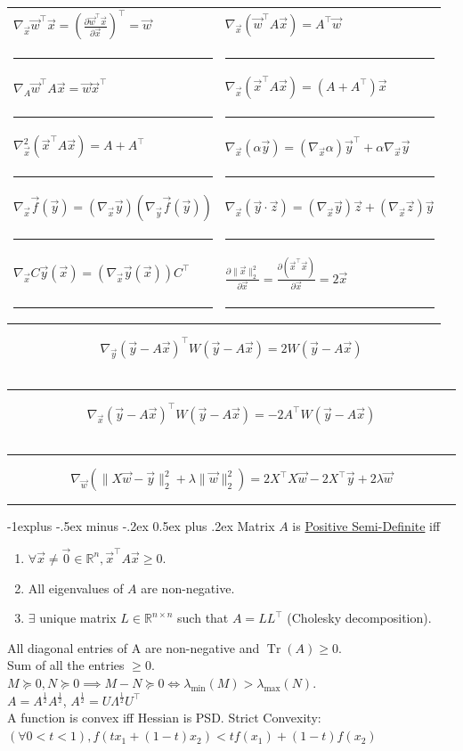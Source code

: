 \documentclass[10pt,landscape]{article}
\makeatletter
\DeclareMathOperator*{\trace}{Tr}
\newcommand{\pderiv}[2]{\frac{\partial #1}{\partial #2}}
\newcommand{\wrap}[3]{\left#1#3\right#2}
\renewcommand{\subsection}{\@startsection{subsection}{2}{0mm}%
                                {-1explus -.5ex minus -.2ex}%
                                {0.5ex plus .2ex}%
                                {\normalfont\normalsize\bfseries}}
\makeatother
\begin{document}
\begin{multicols}{3}
\begin{tabular}{@{}p{}%
                @{}p{}@{}}
$\nabla_{\vec x}{\vec w^\top \vec x} = \wrap(){\pderiv{\vec w^\top \vec x}{\vec x}}^\top = \vec{w}$ & $\nabla_{\vec x}{(\vec w^\top A\vec x)}= A^{\top}\vec w$ \\
\hrule&\hrule\\
$\nabla_{A}{\vec w^\top A\vec x}=\vec w\vec x^\top$ & $\nabla_{\vec x}{(\vec x^\top A\vec x)} = (A+A^\top)\vec x$ \\
\hrule&\hrule\\
$\nabla_{\vec x}^2{(\vec x^\top A\vec x)} = A+A^\top$ & $\nabla_{\vec x}{(\alpha \vec{y})} = (\nabla_{\vec x}{\alpha})\vec{y}^{\top} + \alpha \nabla_{\vec x}{\vec y}$ \\
\hrule&\hrule
\\
$\nabla_{\vec x}{\vec{f}(\vec y)} = (\nabla_{\vec x}{\vec y})(\nabla_{\vec y}{\vec{f}(\vec y)})$ & $\nabla_{\vec x}(\vec{y} \cdot \vec{z}) = (\nabla_{\vec x}{\vec y})\vec{z}+(\nabla_{\vec x}{\vec z})\vec{y}$ \\
\hrule & \hrule
\\
$\nabla_{\vec x}{C\vec y(\vec{x})} = (\nabla_{\vec x}{\vec y(\vec x)})C^\top$ & $\pderiv{\|\vec x\|_2^2}{\vec x}=\pderiv{(\vec x^\top\vec x)}{\vec x}=2\vec x$ \\
\hrule&\hrule
\end{tabular} \vspace{-0.1cm}
$$\nabla_{\vec{y}} (\vec{y} - A \vec{x})^{\top} W(\vec{y} - A \vec{x}) = 2W(\vec{y} - A \vec{x})$$ \\
\hrule
$$\nabla_{\vec{x}} (\vec{y} - A \vec{x})^{\top} W(\vec{y} - A \vec{x}) = -2A^{\top}W(\vec{y} - A \vec{x})$$  \\
\hrule
$$\nabla_{\vec w} \wrap(){\|X\vec w-\vec y\|_2^2+\lambda\|\vec w\|_2^2} = 2X^\top X\vec w-2X^\top \vec y+2\lambda\vec w$$
\hrule

\subsection{Matrix $A$ is \underline{Positive Semi-Definite} iff}
\begin{enumerate}[label=(\alph*)]
    \item $\forall \vec x \neq \vec{0} \in \mathbb{R}^{n}, \vec x^{\top} A \vec x \geq 0$.
    \item All eigenvalues of $A$ are non-negative.
    \item $\exists$ unique matrix $L \in \mathbb{R}^{n \times n}$ such that $A=L L^{\top}$ (Cholesky decomposition).
\end{enumerate}
All diagonal entries of A are non-negative and $\trace(A)\geq0$. \\
Sum of all the entries $\geq0$.\\
$M\succeq0, N\succeq0\implies M-N\succeq0\iff\lambda_{\min}(M)>\lambda_{\max}(N)$.\\
$A = A^{\frac{1}{2}}A^{\frac{1}{2}}$, $A^{\frac{1}{2}} = U \Lambda^{\frac{1}{2}}U^{\top}$  \\
A function is convex iff Hessian is PSD. Strict Convexity: $(\forall 0<t<1), f(tx_1+(1-t)x_2)<tf(x_1)+(1-t)f(x_2)$



\end{multicols}
\end{document}
